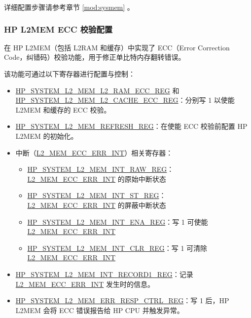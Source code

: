 \documentclass[main\_\_CN.tex]{subfiles}
\begin{document}
详细配置步骤请参考章节 \ref{mod:sysmem} \textit{}。


\subsubsection{HP L2MEM ECC 校验配置}

\chipname{} 在 HP L2MEM（包括 L2RAM 和缓存）中实现了 ECC（Error Correction Code，纠错码）校验功能，用于修正单比特内存翻转错误。

该功能可通过以下寄存器进行配置与控制：
\begin{itemize}
    \item \hyperref[regdesc:HPSYSTEML2MEML2RAMECCREG]{HP\_SYSTEM\_L2\_MEM\_L2\_RAM\_ECC\_REG} 和 \hyperref[regdesc:HPSYSTEML2MEML2CACHEECCREG]{HP\_SYSTEM\_L2\_MEM\_L2\_CACHE\_ECC\_REG}：分别写 1 以使能 L2MEM 和缓存的 ECC 校验。
    \item \hyperref[regdesc:HPSYSTEML2MEMREFRESHREG]{HP\_SYSTEM\_L2\_MEM\_REFRESH\_REG}：在使能 ECC 校验前配置 HP L2MEM 的初始化。
    \item 中断（\hyperref[tab:sysreg-int-sources]{L2\_MEM\_ECC\_ERR\_INT}）相关寄存器：
    \begin{itemize}
        \item \hyperref[regdesc:HPSYSTEML2MEMINTRAWREG]{HP\_SYSTEM\_L2\_MEM\_INT\_RAW\_REG}：\hyperref[tab:sysreg-int-sources]{L2\_MEM\_ECC\_ERR\_INT} 的原始中断状态
        \item \hyperref[regdesc:HPSYSTEML2MEMINTSTREG]{HP\_SYSTEM\_L2\_MEM\_INT\_ST\_REG}：\hyperref[tab:sysreg-int-sources]{L2\_MEM\_ECC\_ERR\_INT} 的屏蔽中断状态
        \item \hyperref[regdesc:HPSYSTEML2MEMINTENAREG]{HP\_SYSTEM\_L2\_MEM\_INT\_ENA\_REG}：写 1 可使能 \hyperref[tab:sysreg-int-sources]{L2\_MEM\_ECC\_ERR\_INT}
        \item \hyperref[regdesc:HPSYSTEML2MEMINTCLRREG]{HP\_SYSTEM\_L2\_MEM\_INT\_CLR\_REG}：写 1 可清除 \hyperref[tab:sysreg-int-sources]{L2\_MEM\_ECC\_ERR\_INT}
    \end{itemize}
    \item \hyperref[regdesc:HPSYSTEML2MEMINTRECORD1REG]{HP\_SYSTEM\_L2\_MEM\_INT\_RECORD1\_REG}：记录 \hyperref[tab:sysreg-int-sources]{L2\_MEM\_ECC\_ERR\_INT} 发生时的信息。
    \item \hyperref[regdesc:HPSYSTEML2MEMERRRESPCTRLREG]{HP\_SYSTEM\_L2\_MEM\_ERR\_RESP\_CTRL\_REG}：写 1 后，HP L2MEM 会将 ECC 错误报告给 HP CPU 并触发异常。
\end{itemize}
\end{document}
